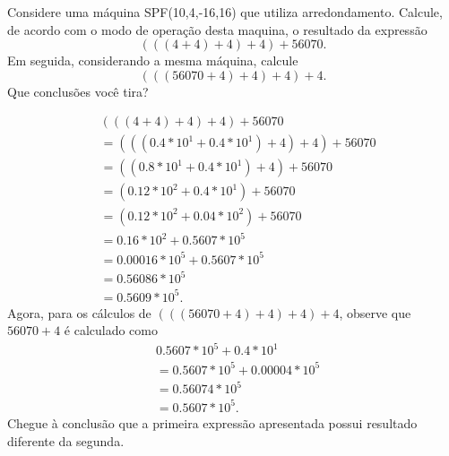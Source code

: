 \begin{ex}
Considere uma máquina SPF(10,4,-16,16) que utiliza arredondamento. Calcule, de acordo com o modo de operação desta maquina, o resultado da expressão 
$$(((4+4)+4)+4)+56070.$$
Em seguida, considerando a mesma máquina, calcule 
$$(((56070+4)+4)+4)+4.$$
Que conclusões você tira?

	\begin{sol}
		\begin{align*}
		&(((4+4)+4)+4)+56070\\
		&=(((0.4*10^1+0.4*10^1)+4)+4)+56070\\
		&=((0.8*10^1+0.4*10^1)+4)+56070\\
		&=(0.12*10^2+0.4*10^1)+56070\\
		&=(0.12*10^2+0.04*10^2)+56070\\
		&=0.16*10^2+0.5607*10^5\\
		&=0.00016*10^5+0.5607*10^5\\
		&=0.56086*10^5\\
		&=0.5609*10^5.
		\end{align*}
		Agora, para os cálculos de $(((56070+4)+4)+4)+4$, observe que $56070+4$ é calculado como 
		\begin{align*}
		 &0.5607*10^5+0.4*10^1\\
		 &=0.5607*10^5+0.00004*10^5\\
		 &=0.56074*10^5\\
		 &=0.5607*10^5.
		\end{align*}Chegue à conclusão que a primeira expressão apresentada possui resultado diferente da segunda.
	\end{sol}

\end{ex}





